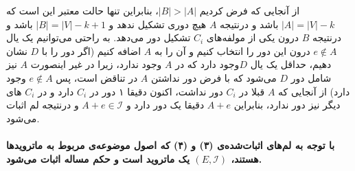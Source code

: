 \documentclass[a4paper,12pt]{article}
\begin{document}
از  آنجایی که  فرض کردیم $|B| > |A|$، بنابراین تنها حالت معتبر این است که 
$|A| = |V| - k$
باشد و درنتیجه $A$ هیچ دوری تشکیل ندهد و 
$|B| = |V| - k + 1$
باشد و درنتیجه $B$ درون یکی از مولفه‌های $C_i$ تشکیل دور می‌دهد. به راحتی می‌توانیم یک یال $e \notin A$ درون این دور را انتخاب کنیم و آن را به $A$ اضافه کنیم (اگر دور را با $D$ نشان دهیم، حداقل یک یال $D$وجود دارد که در $A$ وجود ندارد، زیرا در غیر اینصورت $A$ نیز شامل دور $D$ می‌شود که با فرض دور نداشتن $A$ در تناقض است، پس $e \notin A$ وجود دارد) از آنجایی که  $A$ قبلا در $C_i$ دور نداشت، اکنون دقیقا ۱ دور در $C_i$ دارد و در $C_i$ های دیگر نیز دور ندارد، بنابراین
$A + e$
دقیقا یک دور دارد و
$A + e \in \mathcal{I}$
و درنتیجه لم اثبات می‌شود.

\paragraph{
با توجه به لم‌های اثبات‌شده‌ی (۳) و (۴) که اصول موضوعه‌ی مربوط به ماتروید‌ها هستند، 
$(E,\mathcal{I})$
 یک ماتروید است و حکم مساله اثبات می‌شود.\\}
\end{document}
